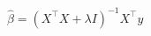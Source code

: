 \documentclass[12pt]{standalone}
\begin{document}
$\hat\beta=(X^\top X+\lambda I)^{-1}X^\top y$
\end{document}
